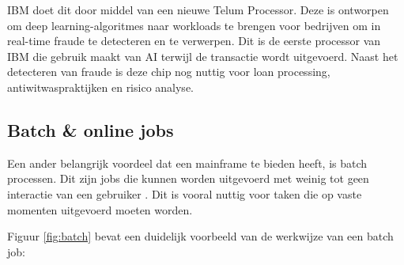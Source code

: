 IBM doet dit door middel van een nieuwe Telum Processor. Deze is ontworpen om deep learning-algoritmes naar workloads te brengen voor bedrijven om in real-time fraude te detecteren en te verwerpen. Dit is de eerste processor van IBM die gebruik maakt van AI terwijl de transactie wordt uitgevoerd. Naast het detecteren van fraude is deze chip nog nuttig voor loan processing, antiwitwaspraktijken en risico analyse. \autocite{IBM2021a} \\

\subsection{Batch \& online jobs}
Een ander belangrijk voordeel dat een mainframe te bieden heeft, is batch processen. Dit zijn jobs die kunnen worden uitgevoerd met weinig tot geen interactie van een gebruiker \autocite{IBM}. Dit is vooral nuttig voor taken die op vaste momenten uitgevoerd moeten worden.

Figuur \ref{fig:batch} bevat een duidelijk voorbeeld van de werkwijze van een batch job:

